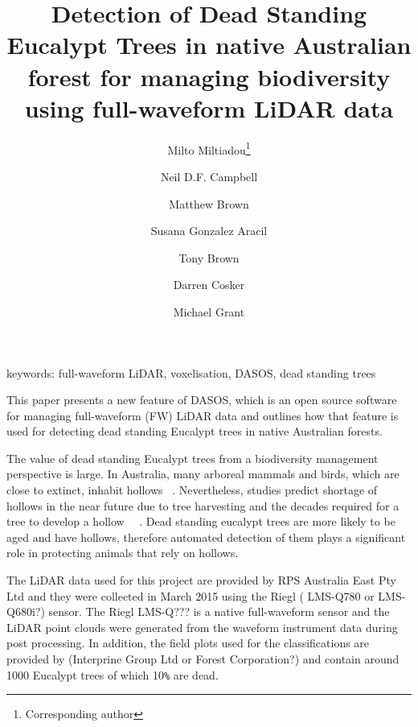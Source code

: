 \documentclass{article}
\begin{document}
	\title{\textbf{Detection of Dead Standing Eucalypt Trees in native Australian forest for managing biodiversity using full-waveform LiDAR data}}
	\date{\vspace{-5ex}}
	\author [1,2,3]{Milto Miltiadou\thanks{Corresponding author}}
	\author [1]{Neil D.F. Campbell}
	\author [1]{Matthew Brown}
	\author [3]{Susana Gonzalez Aracil}
	\author [4]{Tony Brown}
	\author [1]{Darren Cosker}
	\author [2]{ Michael Grant}
	
	\renewcommand\Authands{and}
	\renewcommand{\floatpagefraction}{1}%


 \maketitle
  
\thispagestyle{empty}


keywords: full-waveform LiDAR, voxelisation, DASOS, dead standing trees


This paper presents a new feature of DASOS, which is an open source software for managing full-waveform (FW) LiDAR data and outlines how that feature is used for detecting dead standing Eucalypt trees in native Australian forests.

The value of dead standing Eucalypt trees from a biodiversity management perspective is large. In Australia, many arboreal mammals and birds, which are close to extinct, inhabit hollows ~\cite{Gibbons2002}. Nevertheless, studies predict shortage of hollows in the near future due to tree harvesting and the decades required for a tree to develop a hollow ~\cite{Lindenmayer2010}~\cite{Goldingay2009}. Dead standing eucalypt trees are more likely to be aged and have hollows, therefore automated detection of them plays a significant role in protecting animals that rely on hollows. 

The LiDAR data used for this project are provided by RPS Australia East Pty Ltd and they were collected in March 2015 using the Riegl ( LMS-Q780 or LMS-Q680i?) sensor. The Riegl LMS-Q??? is a native full-waveform sensor and the LiDAR point clouds were generated from the waveform instrument data during post processing. In addition, the field plots used for the classifications are provided by (Interprine Group Ltd or Forest Corporation?) and contain around 1000 Eucalypt trees of which 10\verb|%| are dead. 
\end{document}
